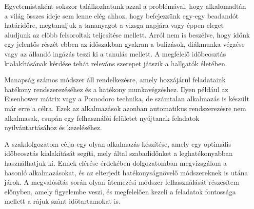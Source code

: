 
Egyetemistaként sokszor találkozhatunk azzal a problémával, hogy alkalomadtán a világ összes ideje sem lenne elég ahhoz, hogy befejezzünk egy-egy beadandót határidőre, megtanuljuk a tananyagot a vizsga napjára vagy éppen eleget aludjunk az előbb felsoroltak teljesítése mellett. Arról nem is beszélve, hogy időnk egy jelentős részét ebben az időszakban gyakran a bulizások, diákmunka végzése vagy az állandó ingázás teszi ki a tanulás mellett. A megfelelő időbeosztás kialakításának kérdése tehát releváns szerepet játszik a hallgatók életében.

Manapság számos módszer áll rendelkezésre, amely hozzájárul feladataink hatékony rendszerezéséhez és a hatékony munkavégzéshez. Ilyen például az Eisenhower mátrix vagy a Pomodoro technika, de számtalan alkalmazás is készült már erre a célra. Ezek az alkalmazások azonban automatikus rendszerezésre nem alkalmasak, csupán egy felhasználói felületet nyújtanak feladatok nyilvántartásához és kezeléséhez.

A szakdolgozatom célja egy olyan alkalmazás készítése, amely egy optimális időbeosztás kialakítását segíti, mely által szabadidőnket a leghatékonyabban használhatjuk ki. Ennek elérése érdekében dolgozatomban megvizsgálom a hasonló alkalmazásokat, és az elterjedt hatékonyságnövelő módszereknek is utána járok. A megvalósítás során olyan ütemezési módszer felhasználását részesítem előnyben, amely figyelembe veszi, és megfelelően kezeli a feladatok fontossága mellett a rájuk szánt időtartamokat is.
